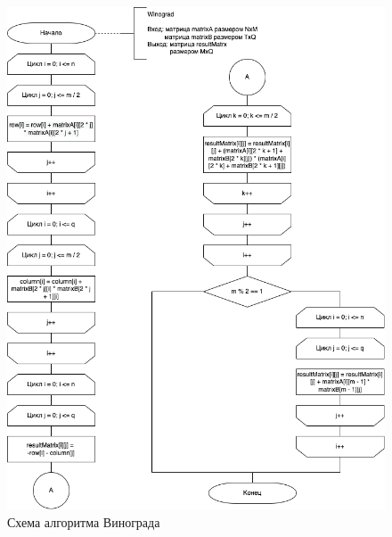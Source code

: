 \begin{figure}[ht!]
	\centering
	\includegraphics[scale=0.65]{img/Winograd.png}
	\caption{Схема алгоритма Винограда}
	\label{fig:mpr}
\end{figure}

